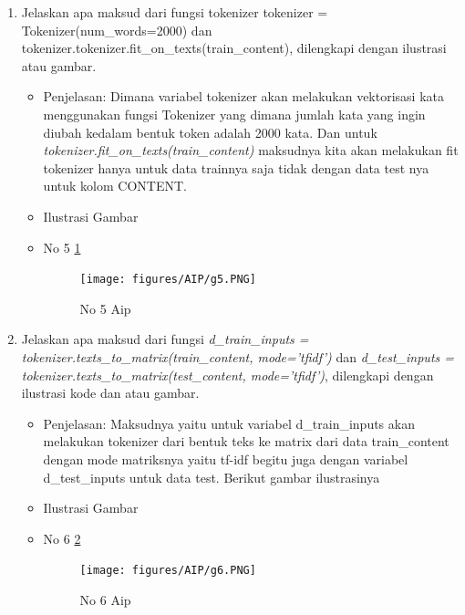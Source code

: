 \begin{enumerate}
\item Jelaskan apa maksud dari fungsi tokenizer {tokenizer = Tokenizer(num\_words=2000)} dan tokenizer.{tokenizer.fit\_on\_texts(train\_content)}, dilengkapi dengan ilustrasi atau gambar.
\begin{itemize}
\item Penjelasan: Dimana variabel tokenizer akan melakukan vektorisasi kata menggunakan fungsi Tokenizer yang dimana jumlah kata yang ingin diubah kedalam bentuk token adalah 2000 kata. Dan untuk \emph{tokenizer.fit\_on\_texts(train\_content)} maksudnya kita akan melakukan fit tokenizer hanya untuk data trainnya saja tidak dengan data test nya untuk kolom CONTENT. 
\par 
\par
\item Ilustrasi Gambar
\item No 5 \ref{teori5}
\begin{figure}[!hbtp]
\centering
\texttt{[image: figures/AIP/g5.PNG]}
\caption{No 5 Aip}
\label{teori5}
\end{figure}
\par
\end{itemize}
\par
\par


\item Jelaskan apa maksud dari fungsi \emph{d\_train\_inputs = tokenizer.texts\_to\_matrix(train\_content, mode='tfidf')} dan \emph{d\_test\_inputs = tokenizer.texts\_to\_matrix(test\_content, mode='tfidf')}, dilengkapi dengan ilustrasi kode dan atau gambar.
\begin{itemize}
\item Penjelasan: Maksudnya yaitu untuk variabel d\_train\_inputs akan melakukan tokenizer dari bentuk teks ke matrix dari data train\_content dengan mode matriksnya yaitu tf-idf begitu juga dengan variabel d\_test\_inputs untuk data test. Berikut gambar ilustrasinya
\par 
\par
\item Ilustrasi Gambar
\item No 6 \ref{teori6}
\begin{figure}[!hbtp]
\centering
\texttt{[image: figures/AIP/g6.PNG]}
\caption{No 6 Aip}
\label{teori6}
\end{figure}
\par
\end{itemize}
\par
\par


\end{enumerate}

